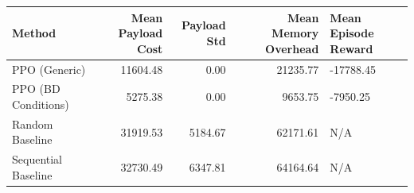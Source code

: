 \begin{tabular}{lrrrl}
\toprule
Method & Mean Payload Cost & Payload Std & Mean Memory Overhead & Mean Episode Reward \\
\midrule
PPO (Generic) & 11604.48 & 0.00 & 21235.77 & -17788.45 \\
PPO (BD Conditions) & 5275.38 & 0.00 & 9653.75 & -7950.25 \\
Random Baseline & 31919.53 & 5184.67 & 62171.61 & N/A \\
Sequential Baseline & 32730.49 & 6347.81 & 64164.64 & N/A \\
\bottomrule
\end{tabular}
